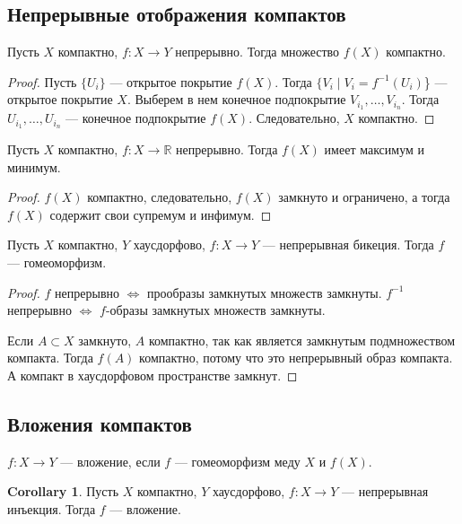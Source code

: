 \documentclass[11pt]{book}
\newcommand{\R}{\mathbb{R}}
\theoremstyle{definition}
\theoremstyle{plain}
\theoremstyle{plain}
\theoremstyle{definition}
\newtheorem*{cor}{Corollary}
\theoremstyle{remark}
\begin{document}
\subsection{Непрерывные отображения компактов}
\begin{thm}
    Пусть $ X$ компактно,  $ f: X \to  Y$ непрерывно.
    Тогда множество  $ f(X)$ компактно.
\end{thm}
\begin{proof}
    Пусть  $ \{U_i\}$ --- открытое покрытие $ f(X)$. Тогда  $ \{V_i \mid V_i = f^{-1}(U_i)$\} ---  открытое покрытие $ X$.
    Выберем в нем конечное подпокрытие  $ V_{i_1}, \ldots , V_{i_n}$. Тогда $ U_{i_1}, \ldots, U_{i_n}$ --- конечное подпокрытие $ f(X)$. Следовательно,  $ X$ компактно.
\end{proof}
\begin{thm}[Вейерштрасс]
    Пусть $ X$ компактно,  $ f: X \to  \R$ непрерывно. Тогда $ f(X)$ имеет максимум и минимум.
\end{thm}
\begin{proof}
    $ f(X)$ компактно, следовательно,  $ f(X)$ замкнуто и ограничено, а тогда  $ f(X)$ содержит свои супремум и инфимум.
\end{proof}
\begin{thm}
    Пусть $ X$ компактно,  $ Y$  хаусдорфово, $ f: X \to  Y$ --- непрерывная бикеция. Тогда $ f$ --- гомеоморфизм.
\end{thm}
\begin{proof}
    $ f$ непрерывно  $ \Longleftrightarrow $ прообразы замкнутых множеств замкнуты.
    $ f^{-1}$ непрерывно $ \Longleftrightarrow $ $ f$-образы замкнутых множеств замкнуты.

    Если  $ A \subset X$ замкнуто,
    $ A$ компактно, так как является  замкнутым подмножеством компакта.  Тогда $ f(A)$ компактно, потому что это непрерывный образ компакта. А компакт в хаусдорфовом пространстве замкнут.
\end{proof}
\subsection{Вложения компактов}
\begin{defn}
    $ f: X \to  Y$ --- вложение, если $ f$ ---  гомеоморфизм меду  $ X$ и  $ f(X)$.
\end{defn}
\begin{cor}
    Пусть $ X$ компактно,  $ Y$ хаусдорфово,  $ f: X \to  Y$ --- непрерывная  инъекция. Тогда $ f$ --- вложение.
\end{cor}
\end{document}
